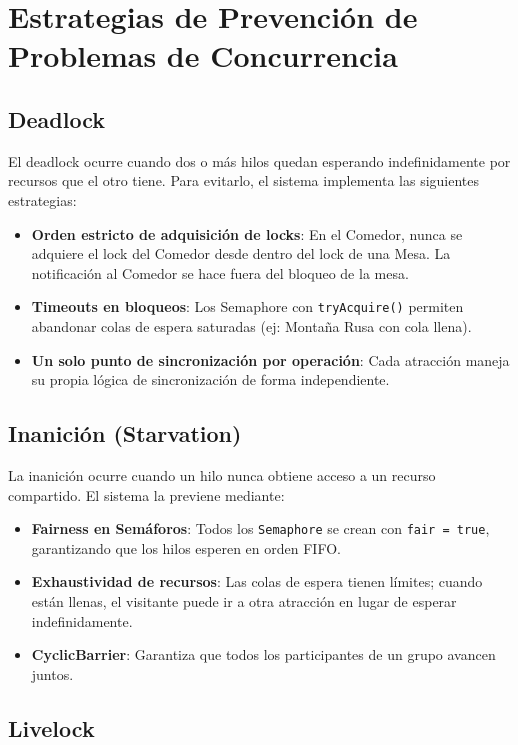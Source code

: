 \documentclass[12pt,a4paper]{article}
\begin{document}
\section{Estrategias de Prevención de Problemas de Concurrencia}

\subsection{Deadlock}

El deadlock ocurre cuando dos o más hilos quedan esperando indefinidamente por recursos que el otro tiene. Para evitarlo, el sistema implementa las siguientes estrategias:

\begin{itemize}
    \item \textbf{Orden estricto de adquisición de locks}: En el Comedor, nunca se adquiere el lock del Comedor desde dentro del lock de una Mesa. La notificación al Comedor se hace fuera del bloqueo de la mesa.
    \item \textbf{Timeouts en bloqueos}: Los Semaphore con \texttt{tryAcquire()} permiten abandonar colas de espera saturadas (ej: Montaña Rusa con cola llena).
    \item \textbf{Un solo punto de sincronización por operación}: Cada atracción maneja su propia lógica de sincronización de forma independiente.
\end{itemize}

\subsection{Inanición (Starvation)}

La inanición ocurre cuando un hilo nunca obtiene acceso a un recurso compartido. El sistema la previene mediante:

\begin{itemize}
    \item \textbf{Fairness en Semáforos}: Todos los \texttt{Semaphore} se crean con \texttt{fair = true}, garantizando que los hilos esperen en orden FIFO.
    \item \textbf{Exhaustividad de recursos}: Las colas de espera tienen límites; cuando están llenas, el visitante puede ir a otra atracción en lugar de esperar indefinidamente.
    \item \textbf{CyclicBarrier}: Garantiza que todos los participantes de un grupo avancen juntos.
\end{itemize}

\subsection{Livelock}
\end{document}
